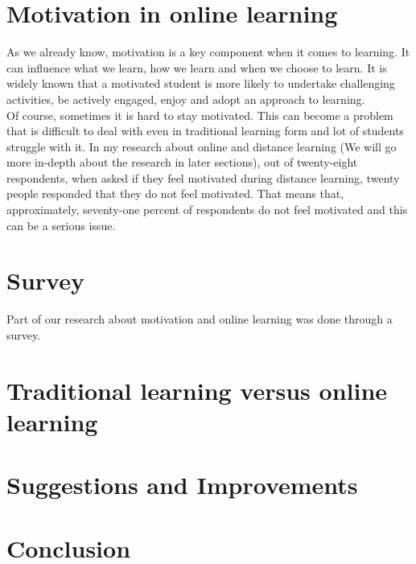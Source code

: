 \documentclass[10pt,twoside,slovak,a4paper]{article}
\begin{document}
\section{Motivation in online learning}
As we already know, motivation is a key component when it comes to learning. It can influence what we learn, how we learn and when we choose to learn.\cite{Schunk} It is widely known that a motivated student is more likely to undertake challenging activities, be actively engaged, enjoy and adopt an approach to learning. \\
Of course, sometimes it is hard to stay motivated. This can become a problem that is difficult to deal with even in traditional learning form and lot of students struggle with it. In my research about online and distance learning (We will go more in-depth about the research in later sections), out of twenty-eight respondents, when asked if they feel motivated during distance learning, twenty people responded that they do not feel motivated. That means that, approximately, seventy-one percent of respondents do not feel motivated and this can be a serious issue.

\section{Survey}
Part of our research about motivation and online learning was done through a survey. %

\section{Traditional learning versus online learning}

\section{Suggestions and Improvements}

\section{Conclusion}




\clearpage

 
\end{document}
